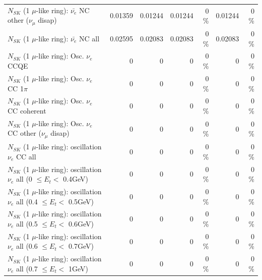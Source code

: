 \begin{table}
\begin{tabular}{| l | r | r | r  r | r  r |}
          $N_{SK}$ (1 $\mu$-like ring): $\bar{\nu_e}$ NC other ($\nu_\mu$ disap) &         0.01359 &         0.01244 &         0.01244 &        0 \%  &         0.01244 &        0 \%  \\ 
                            $N_{SK}$ (1 $\mu$-like ring): $\bar{\nu_{e}}$ NC all &         0.02595 &         0.02083 &         0.02083 &        0 \%  &         0.02083 &        0 \%  \\ 
\hline
\hline
\hline
                                 $N_{SK}$ (1 $\mu$-like ring): Osc. $\nu_e$ CCQE &               0 &               0 &               0 &        0 \%  &               0 &        0 \%  \\ 
                            $N_{SK}$ (1 $\mu$-like ring): Osc. $\nu_e$ CC 1$\pi$ &               0 &               0 &               0 &        0 \%  &               0 &        0 \%  \\ 
                          $N_{SK}$ (1 $\mu$-like ring): Osc. $\nu_e$ CC coherent &               0 &               0 &               0 &        0 \%  &               0 &        0 \%  \\ 
           $N_{SK}$ (1 $\mu$-like ring): Osc. $\nu_e$ CC other ($\nu_\mu$ disap) &               0 &               0 &               0 &        0 \%  &               0 &        0 \%  \\ 
                        $N_{SK}$ (1 $\mu$-like ring): oscillation $\nu_e$ CC all &               0 &               0 &               0 &        0 \%  &               0 &        0 \%  \\ 
\hline
$N_{SK}$ (1 $\mu$-like ring): oscillation $\nu_{e}$ all (0 $\leq E_{t} <$ 0.4GeV) &               0 &               0 &               0 &        0 \%  &               0 &        0 \%  \\ 
$N_{SK}$ (1 $\mu$-like ring): oscillation $\nu_{e}$ all (0.4 $\leq E_{t} <$ 0.5GeV) &               0 &               0 &               0 &        0 \%  &               0 &        0 \%  \\ 
$N_{SK}$ (1 $\mu$-like ring): oscillation $\nu_{e}$ all (0.5 $\leq E_{t} <$ 0.6GeV) &               0 &               0 &               0 &        0 \%  &               0 &        0 \%  \\ 
$N_{SK}$ (1 $\mu$-like ring): oscillation $\nu_{e}$ all (0.6 $\leq E_{t} <$ 0.7GeV) &               0 &               0 &               0 &        0 \%  &               0 &        0 \%  \\ 
$N_{SK}$ (1 $\mu$-like ring): oscillation $\nu_{e}$ all (0.7 $\leq E_{t} <$ 1GeV) &               0 &               0 &               0 &        0 \%  &               0 &        0 \%  \\ 

\end{tabular}
\end{table}
